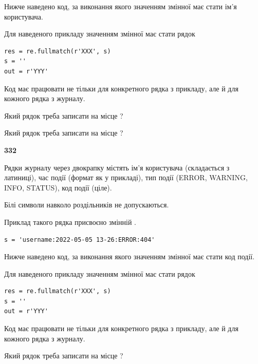 Нижче наведено код, за виконання якого значенням змінної  має стати ім'я користувача.

Для наведеного прикладу значенням змінної  має стати рядок 



\begin{verbatim}
res = re.fullmatch(r'XXX', s)
s = ''
out = r'YYY'
\end{verbatim}


Код має працювати не тільки для конкретного рядка з прикладу, але й для кожного рядка з журналу.




Який рядок треба записати на місце  ?\par
\vspace{5mm}


Який рядок треба записати на місце  ?\par


\newpage

{\begin {center}\textbf{ 332}\end {center}}\par
Рядки журналу через двокрапку містять ім'я користувача (складається з латиниці), час події (фор\-мат як у прикладі), тип події (ERROR, WARNING, INFO, STATUS), код події (ціле).

Білі символи навколо роздільників не допускаються.

Приклад такого рядка присвоєно змінній .



\begin{verbatim}
s = 'username:2022-05-05 13-26:ERROR:404'
\end{verbatim}


Нижче наведено код, за виконання якого значенням змінної  має стати код події.

Для наведеного прикладу значенням змінної  має стати рядок 



\begin{verbatim}
res = re.fullmatch(r'XXX', s)
s = ''
out = r'YYY'
\end{verbatim}


Код має працювати не тільки для конкретного рядка з прикладу, але й для кожного рядка з журналу.




Який рядок треба записати на місце  ?\par
\vspace{5mm}


